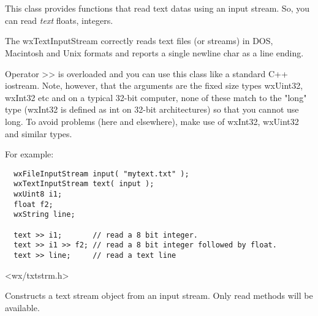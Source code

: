 \section{}\label{wxtextinputstream}

This class provides functions that read text datas using an input stream.
So, you can read {\it text} floats, integers.

The wxTextInputStream correctly reads text files (or streams) in DOS, Macintosh
and Unix formats and reports a single newline char as a line ending.

Operator >> is overloaded and you can use this class like a standard C++ iostream.
Note, however, that the arguments are the fixed size types wxUint32, wxInt32 etc
and on a typical 32-bit computer, none of these match to the "long" type (wxInt32
is defined as int on 32-bit architectures) so that you cannot use long. To avoid
problems (here and elsewhere), make use of wxInt32, wxUint32 and similar types.

For example:

\begin{verbatim}
  wxFileInputStream input( "mytext.txt" );
  wxTextInputStream text( input );
  wxUint8 i1;
  float f2;
  wxString line;

  text >> i1;       // read a 8 bit integer.
  text >> i1 >> f2; // read a 8 bit integer followed by float.
  text >> line;     // read a text line
\end{verbatim}


<wx/txtstrm.h>


\label{wxtextinputstreamconstr}


Constructs a text stream object from an input stream. Only read methods will
be available.





